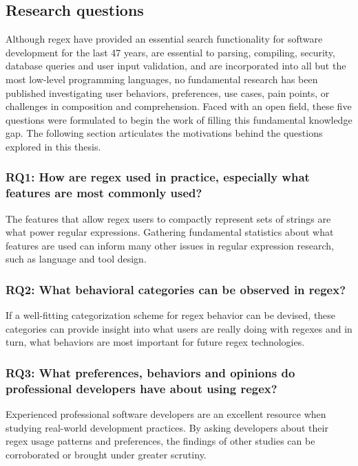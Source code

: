 \subsection{Research questions}

Although regex have provided an essential search functionality for software development for the last 47 years, are essential to parsing, compiling, security, database queries and user input validation, and are incorporated into all but the most low-level programming languages, no fundamental research has been published investigating user behaviors, preferences, use cases, pain points, or challenges in composition and comprehension.  Faced with an open field, these five questions were formulated to begin the work of filling this fundamental knowledge gap.  The following section articulates the motivations behind the questions explored in this thesis.

\subsubsection{RQ1: How are regex used in practice, especially what features are most commonly used?}

The features that allow regex users to compactly represent sets of strings are what power regular expressions.  Gathering fundamental statistics about what features are used can inform many other issues in regular expression research, such as language and tool design.

\subsubsection{RQ2: What behavioral categories can be observed in regex?}

If a well-fitting categorization scheme for regex behavior can be devised, these categories can provide insight into what users are really doing with regexes and in turn, what behaviors are most important for future regex technologies.

\subsubsection{RQ3: What preferences, behaviors and opinions do professional developers have about using regex?}

Experienced professional software developers are an excellent resource when studying real-world development practices.  By asking developers about their regex usage patterns and preferences, the findings of other studies can be corroborated or brought under greater scrutiny.

